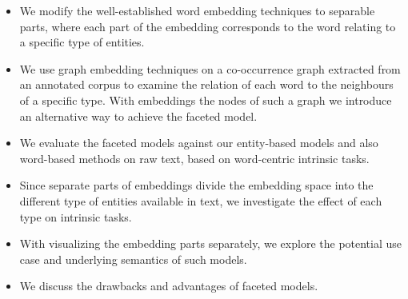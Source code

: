 \begin{itemize}
\item We modify the well-established word embedding techniques to separable parts, where each part of the embedding corresponds to the word relating to a specific type of entities. 
\item We use graph embedding techniques on a co-occurrence graph extracted from an annotated corpus to examine the relation of each word to the neighbours of a specific type. With embeddings the nodes of such a graph we introduce an alternative way to achieve the faceted model. 
\item We evaluate the faceted models against our entity-based models and also word-based methods on raw text, based on word-centric intrinsic tasks. 
\item Since separate parts of embeddings divide the embedding space into the different type of entities available in text, we investigate the effect of each type on intrinsic tasks. 
\item With visualizing the embedding parts separately, we explore the potential use case and underlying semantics of such models. 
\item We discuss the drawbacks and advantages of faceted models. 
  
\end{itemize}



